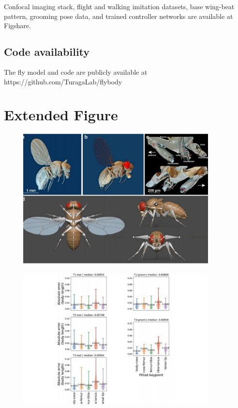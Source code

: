 \documentclass[sn-mathphys-num]{sn-jnl}%
\theoremstyle{thmstyleone}%
\theoremstyle{thmstyletwo}%
\theoremstyle{thmstylethree}%
\begin{document}
Confocal imaging stack, flight and walking imitation datasets, base wing-beat pattern, grooming pose data, and trained controller networks are available at Figshare\cite{vaxenburg2025whole}.


\subsection{Code availability} \label{sec:code_availability}

The fly model and code are publicly available at https://github.com/TuragaLab/flybody


\section{Extended Figure}

\begin{figure}[!htb] 
	\centering
	\includegraphics[width=0.9\textwidth]{fig/extended_fig_1.pdf}
	\caption{
	} \label{fig:extended_fig_1}
\end{figure}


\begin{figure}[!htb] 
	\centering
	\includegraphics[width=0.9\textwidth]{fig/extended_fig_2.pdf}
	\caption{
	} \label{fig:extended_fig_2}
\end{figure}
\end{document}
